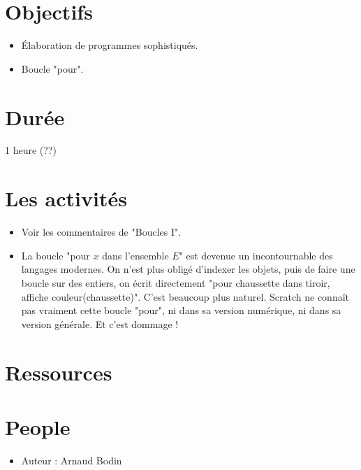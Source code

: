 \documentclass[class=report,crop=false, 12pt]{standalone}
\begin{document}



\section*{Objectifs}

\begin{itemize}
  \item Élaboration de programmes sophistiqués.
  \item Boucle "pour".
\end{itemize}


\section*{Durée}

1 heure (??)

\section*{Les activités}

\begin{itemize}
  \item Voir les commentaires de "Boucles I".
  
  \item La boucle "pour $x$ dans l'ensemble $E$" est devenue un incontournable des langages modernes. On n'est plus obligé d'indexer les objets, puis de faire une boucle sur des entiers, on écrit directement "pour chaussette dans tiroir, affiche couleur(chaussette)". C'est beaucoup plus naturel. Scratch ne connaît pas vraiment cette boucle "pour", ni dans sa version numérique, ni dans sa version générale. Et c'est dommage ! 
  
\end{itemize}


\section*{Ressources}


\section*{People}

\begin{itemize}
  \item Auteur : Arnaud Bodin
\end{itemize}
\end{document}
